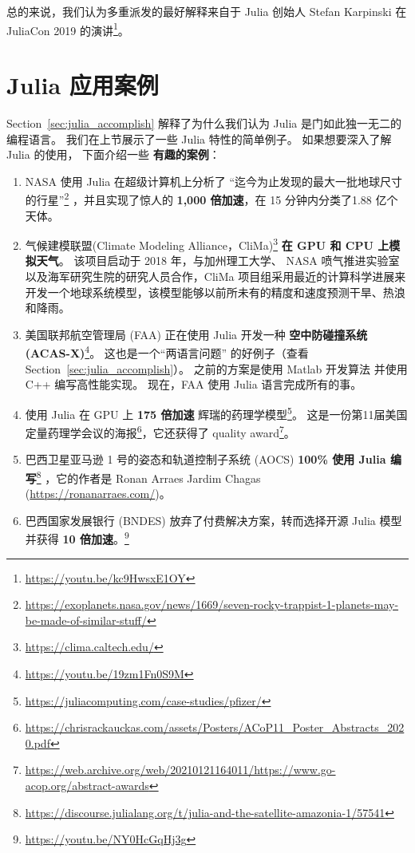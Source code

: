 \documentclass[
  notoc %
]{tufte-book}
\DeclareRobustCommand{\href}[2]{#2\footnote{\url{#1}}}
\providecommand{\tightlist}{%
  \setlength{\itemsep}{0pt}\setlength{\parskip}{0pt}
}
\begin{document}
总的来说，我们认为多重派发的最好解释来自于 Julia 创始人
\href{https://youtu.be/kc9HwsxE1OY}{Stefan Karpinski 在 JuliaCon 2019
的演讲}。

\hypertarget{sec:julia_wild}{%
\section{Julia 应用案例}\label{sec:julia_wild}}

Section~\ref{sec:julia_accomplish} 解释了为什么我们认为 Julia
是门如此独一无二的编程语言。 我们在上节展示了一些 Julia 特性的简单例子。
如果想要深入了解 Julia 的使用， 下面介绍一些 \textbf{有趣的案例}：

\begin{enumerate}
\def\labelenumi{\arabic{enumi}.}
\tightlist
\item
  NASA 使用 Julia 在超级计算机上分析了
  \href{https://exoplanets.nasa.gov/news/1669/seven-rocky-trappist-1-planets-may-be-made-of-similar-stuff/}{``迄今为止发现的最大一批地球尺寸的行星''}
  ，并且实现了惊人的 \textbf{1,000 倍加速}，在 15 分钟内分类了1.88
  亿个天体。
\item
  \href{https://clima.caltech.edu/}{气候建模联盟(Climate Modeling
  Alliance，CliMa)} \textbf{在 GPU 和 CPU 上模拟天气}。 该项目启动于
  2018 年，与加州理工大学、 NASA
  喷气推进实验室以及海军研究生院的研究人员合作，CliMa
  项目组采用最近的计算科学进展来开发一个地球系统模型，该模型能够以前所未有的精度和速度预测干旱、热浪和降雨。
\item
  \href{https://youtu.be/19zm1Fn0S9M}{美国联邦航空管理局 (FAA) 正在使用
  Julia 开发一种 \textbf{空中防碰撞系统 (ACAS-X)}}。
  这也是一个``两语言问题'' 的好例子（查看
  Section~\ref{sec:julia_accomplish}）。 之前的方案是使用 Matlab
  开发算法 并使用 C++ 编写高性能实现。 现在，FAA 使用 Julia
  语言完成所有的事。
\item
  \href{https://juliacomputing.com/case-studies/pfizer/}{使用 Julia 在
  GPU 上 \textbf{175 倍加速} 辉瑞的药理学模型}。
  这是一份第11届美国定量药理学会议的\href{https://chrisrackauckas.com/assets/Posters/ACoP11_Poster_Abstracts_2020.pdf}{海报}，它还获得了
  \href{https://web.archive.org/web/20210121164011/https://www.go-acop.org/abstract-awards}{quality
  award}。
\item
  \href{https://discourse.julialang.org/t/julia-and-the-satellite-amazonia-1/57541}{巴西卫星亚马逊
  1 号的姿态和轨道控制子系统 (AOCS) \textbf{100\% 使用 Julia 编写}}
  ，它的作者是 Ronan Arraes Jardim Chagas
  (\url{https://ronanarraes.com/})。
\item
  \href{https://youtu.be/NY0HcGqHj3g}{巴西国家发展银行 (BNDES)
  放弃了付费解决方案，转而选择开源 Julia 模型并获得 \textbf{10
  倍加速}。}
\end{enumerate}
\end{document}
